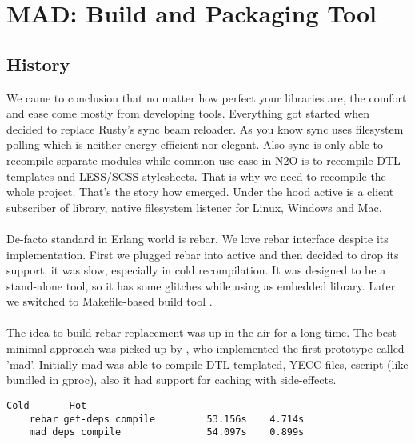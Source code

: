 \section{MAD: Build and Packaging Tool}

\subsection{History}

We came to conclusion that no matter how perfect your libraries are,
the comfort and ease come mostly from developing tools.
Everything got started when  decided to
replace Rusty's sync beam reloader. As you know sync uses
filesystem polling which is neither energy-efficient nor elegant. Also
sync is only able to recompile separate modules while
common use-case in N2O is to recompile DTL templates
and LESS/SCSS stylesheets. That is why we need to recompile
the whole project. That's the story how  emerged.
Under the hood active is a client subscriber
of  library, native filesystem listener for Linux, Windows and Mac.

\paragraph{}
De-facto standard in Erlang world is rebar.
We love rebar interface despite its implementation.
First we plugged rebar into active and then decided to drop its support,
it was slow, especially in cold recompilation.
It was designed to be a stand-alone tool, so it has some
glitches while using as embedded library.
Later we switched to Makefile-based build tool .

\paragraph{}
The idea to build rebar replacement was up in the air for a long time.
The best minimal approach was picked up by ,
who implemented the first prototype called 'mad'. Initially mad
was able to compile DTL templated, YECC files, escript (like
bundled in gproc), also it had support for caching with side-effects.

\vspace{1\baselineskip}
\begin{lstlisting}[caption=Example of building N2O sample]
                                   Cold       Hot
    rebar get-deps compile         53.156s    4.714s
    mad deps compile               54.097s    0.899s
\end{lstlisting}
\vspace{1\baselineskip}

